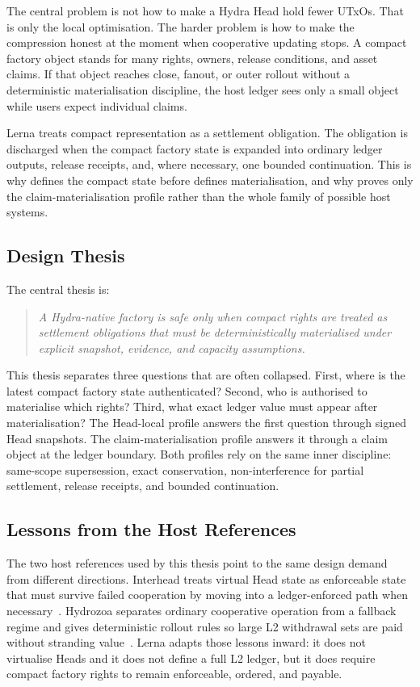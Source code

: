 \documentclass[a4paper,11pt]{article}
\theoremstyle{definition}
\theoremstyle{plain}
\theoremstyle{remark}
\begin{document}
The central problem is not how to make a Hydra Head hold fewer UTxOs. That is
only the local optimisation. The harder problem is how to make the compression
honest at the moment when cooperative updating stops. A compact factory object
stands for many rights, owners, release conditions, and asset claims. If that
object reaches close, fanout, or outer rollout without a deterministic
materialisation discipline, the host ledger sees only a small object while users
expect individual claims.

Lerna treats compact representation as a settlement obligation. The obligation
is discharged when the compact factory state is expanded into ordinary ledger
outputs, release receipts, and, where necessary, one bounded continuation. This
is why  defines the compact state before
 defines materialisation, and why 
proves only the claim-materialisation profile rather than the whole family of
possible host systems.

\subsection{Design Thesis}
\label{sec:design-thesis}

The central thesis is:
\begin{quote}
\emph{A Hydra-native factory is safe only when compact rights are treated as
settlement obligations that must be deterministically materialised under explicit
snapshot, evidence, and capacity assumptions.}
\end{quote}

This thesis separates three questions that are often collapsed. First, where is
the latest compact factory state authenticated? Second, who is authorised to
materialise which rights? Third, what exact ledger value must appear after
materialisation? The Head-local profile answers the first question through
signed Head snapshots. The claim-materialisation profile answers it through a
claim object at the ledger boundary. Both profiles rely on the same inner
discipline: same-scope supersession, exact conservation, non-interference for
partial settlement, release receipts, and bounded continuation.

\subsection{Lessons from the Host References}
\label{sec:host-lessons}

The two host references used by this thesis point to the same design demand from
different directions. Interhead treats virtual Head state as enforceable state
that must survive failed cooperation by moving into a ledger-enforced path when
necessary~\cite{interhead}. Hydrozoa separates ordinary cooperative operation
from a fallback regime and gives deterministic rollout rules so large L2
withdrawal sets are paid without stranding value~\cite{hydrozoa-spec}. Lerna
adapts those lessons inward: it does not virtualise Heads and it does not define
a full L2 ledger, but it does require compact factory rights to remain
enforceable, ordered, and payable.
\end{document}
